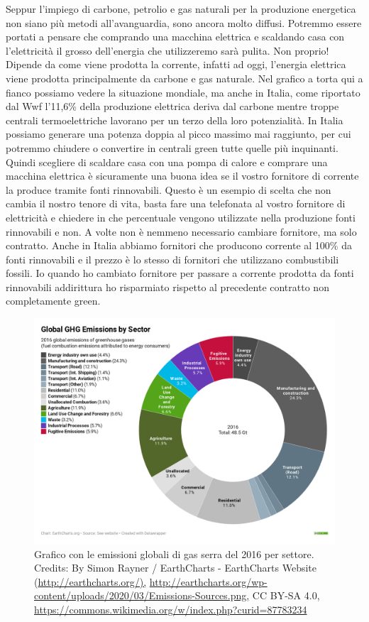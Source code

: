 \documentclass[12pt]{book} %
\begin{document}
Seppur l'impiego di carbone, petrolio e gas naturali per la produzione energetica non siano più
metodi all'avanguardia, sono ancora molto diffusi. Potremmo essere portati a pensare che comprando
una macchina elettrica e scaldando casa con l'elettricità il grosso
dell'energia che utilizzeremo sarà pulita. Non proprio! Dipende da come viene prodotta la
corrente, infatti ad oggi, l'energia elettrica viene prodotta principalmente da carbone e gas
naturale. Nel grafico a torta qui a fianco possiamo vedere la situazione mondiale, ma anche in Italia, come riportato
dal Wwf
l'11,6\% della produzione elettrica deriva dal carbone mentre troppe centrali termoelettriche
lavorano per un terzo della loro potenzialità. In Italia possiamo generare una potenza doppia al picco massimo mai
raggiunto, per cui potremmo chiudere o convertire in centrali green tutte quelle più inquinanti. Quindi scegliere di
scaldare casa con una pompa di calore e comprare una macchina elettrica è sicuramente una buona idea se il vostro
fornitore di corrente la produce tramite fonti rinnovabili. Questo è un esempio di scelta che non cambia il nostro
tenore di vita, basta fare una telefonata al vostro fornitore di elettricità e chiedere in che percentuale vengono
utilizzate nella produzione fonti rinnovabili e non. A volte non è nemmeno necessario cambiare fornitore, ma solo
contratto. Anche in Italia abbiamo fornitori che producono corrente al 100\% da fonti rinnovabili e il prezzo è lo
stesso di fornitori che utilizzano combustibili fossili. Io quando ho cambiato fornitore per passare a corrente
prodotta da fonti rinnovabili addirittura ho risparmiato rispetto al precedente contratto non completamente green.

\begin{figure}[H]
  \centering
  \includegraphics[width=0.95\linewidth]{images/Libro-img026.png}
  \caption{Grafico con le emissioni globali di gas serra del 2016 per settore. 
Credits: By Simon Rayner / EarthCharts - EarthCharts Website (\protect\url{http://earthcharts.org/),}
\protect\url{http://earthcharts.org/wp-content/uploads/2020/03/Emissions-Sources.png,} CC BY-SA 4.0,
\protect\url{https://commons.wikimedia.org/w/index.php?curid=87783234}}
\end{figure}
\end{document}
